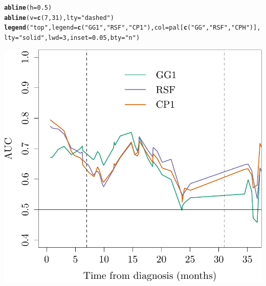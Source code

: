 \documentclass{article}\usepackage[]{graphicx}\usepackage[]{color}
\makeatletter
\def\maxwidth{ %
  \ifdim\Gin@nat@width>\linewidth
    \linewidth
  \else
    \Gin@nat@width
  \fi
}
\newcommand{\hlnum}[1]{\textcolor[rgb]{0.686,0.059,0.569}{#1}}%
\newcommand{\hlstr}[1]{\textcolor[rgb]{0.192,0.494,0.8}{#1}}%
\newcommand{\hlstd}[1]{\textcolor[rgb]{0.345,0.345,0.345}{#1}}%
\newcommand{\hlkwc}[1]{\textcolor[rgb]{0.333,0.667,0.333}{#1}}%
\newcommand{\hlkwd}[1]{\textcolor[rgb]{0.737,0.353,0.396}{\textbf{#1}}}%
\newenvironment{kframe}{%
 \def\at@end@of@kframe{}%
 \ifinner\ifhmode%
  \def\at@end@of@kframe{\end{minipage}}%
  \begin{minipage}{\columnwidth}%
 \fi\fi%
 \def\FrameCommand##1{\hskip\@totalleftmargin \hskip-\fboxsep
 \colorbox{shadecolor}{##1}\hskip-\fboxsep
     \hskip-\linewidth \hskip-\@totalleftmargin \hskip\columnwidth}%
 \MakeFramed {\advance\hsize-\width
   \@totalleftmargin\z@ \linewidth\hsize
   \@setminipage}}%
 {\par\unskip\endMakeFramed%
 \at@end@of@kframe}
\newenvironment{knitrout}{}{} %
\makeatother
\begin{document}
\begin{knitrout}
\begin{kframe}
\begin{alltt}
\hlkwd{abline}\hlstd{(}\hlkwc{h} \hlstd{=} \hlnum{0.5}\hlstd{)}
\hlkwd{abline}\hlstd{(}\hlkwc{v} \hlstd{=} \hlkwd{c}\hlstd{(}\hlnum{7}\hlstd{,} \hlnum{31}\hlstd{),} \hlkwc{lty} \hlstd{=} \hlstr{"dashed"}\hlstd{)}
\hlkwd{legend}\hlstd{(}\hlstr{"top"}\hlstd{,} \hlkwc{legend} \hlstd{=} \hlkwd{c}\hlstd{(}\hlstr{"GG1"}\hlstd{,} \hlstr{"RSF"}\hlstd{,} \hlstr{"CP1"}\hlstd{),} \hlkwc{col} \hlstd{= pal[}\hlkwd{c}\hlstd{(}\hlstr{"GG"}\hlstd{,} \hlstr{"RSF"}\hlstd{,} \hlstr{"CPH"}\hlstd{)],} \hlkwc{lty} \hlstd{=} \hlstr{"solid"}\hlstd{,} \hlkwc{lwd} \hlstd{=} \hlnum{3}\hlstd{,} \hlkwc{inset} \hlstd{=} \hlnum{0.05}\hlstd{,} \hlkwc{bty} \hlstd{=} \hlstr{"n"}\hlstd{)}
\end{alltt}
\end{kframe}

{\centering \includegraphics[width=\maxwidth]{figure/05-model-selection-roc-id-1} 

}



\end{knitrout}
\end{document}
